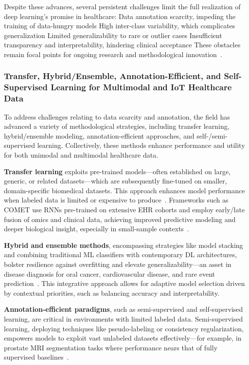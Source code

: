 \documentclass[sigconf]{acmart}
\begin{document}
Despite these advances, several persistent challenges limit the full realization of deep learning’s promise in healthcare:
Data annotation scarcity, impeding the training of data-hungry models
High inter-class variability, which complicates generalization
Limited generalizability to rare or outlier cases
Insufficient transparency and interpretability, hindering clinical acceptance
These obstacles remain focal points for ongoing research and methodological innovation~\cite{ref30, ref41, ref49, ref53, ref54, ref56, ref65, ref71}.

\subsubsection{Transfer, Hybrid/Ensemble, Annotation-Efficient, and Self-Supervised Learning for Multimodal and IoT Healthcare Data}

To address challenges relating to data scarcity and annotation, the field has advanced a variety of methodological strategies, including transfer learning, hybrid/ensemble modeling, annotation-efficient approaches, and self-/semi-supervised learning. Collectively, these methods enhance performance and utility for both unimodal and multimodal healthcare data.

\textbf{Transfer learning} exploits pre-trained models—often established on large, generic, or related datasets—which are subsequently fine-tuned on smaller, domain-specific biomedical datasets. This approach enhances model performance when labeled data is limited or expensive to produce~\cite{ref31, ref33, ref54, ref55, ref65, ref90, ref76}. Frameworks such as COMET use RNNs pre-trained on extensive EHR cohorts and employ early/late fusion of omics and clinical data, achieving improved predictive modeling and deeper biological insight, especially in small-sample contexts~\cite{ref49}.

\textbf{Hybrid and ensemble methods}, encompassing strategies like model stacking and combining traditional ML classifiers with contemporary DL architectures, bolster resilience against overfitting and elevate generalizability—an asset in disease diagnosis for oral cancer, cardiovascular disease, and rare event prediction~\cite{ref16, ref50, ref53, ref54, ref62, ref71, ref90}. This integrative approach allows for adaptive model selection driven by contextual priorities, such as balancing accuracy and interpretability.

\textbf{Annotation-efficient paradigms}, such as semi-supervised and self-supervised learning, are critical in environments with limited labeled data. Semi-supervised learning, deploying techniques like pseudo-labeling or consistency regularization, empowers models to exploit vast unlabeled datasets effectively—for example, in prostate MRI segmentation tasks where performance nears that of fully supervised baselines~\cite{ref61, ref76, ref77}.
\end{document}
